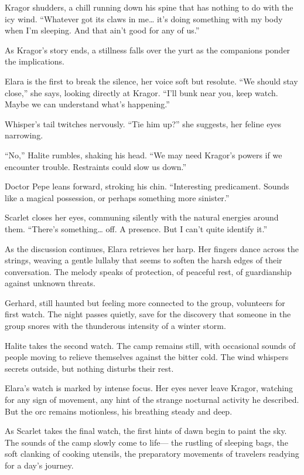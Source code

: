 \documentclass[
  letterpaper,12pt,twoside,twocolumn,openany,
  nodeprecatedcode,bg=full]{dndbook}
\begin{document}
Kragor shudders, a chill running down his spine that has nothing to do
with the icy wind. ``Whatever got its claws in me\ldots{} it's doing
something with my body when I'm sleeping. And that ain't good for any of
us.''

As Kragor's story ends, a stillness falls over the yurt as the
companions ponder the implications.

Elara is the first to break the silence, her voice soft but resolute.
``We should stay close,'' she says, looking directly at Kragor. ``I'll
bunk near you, keep watch. Maybe we can understand what's happening.''

Whisper's tail twitches nervously. ``Tie him up?'' she suggests, her
feline eyes narrowing.

``No,'' Halite rumbles, shaking his head. ``We may need Kragor's powers
if we encounter trouble. Restraints could slow us down.''

Doctor Pepe leans forward, stroking his chin. ``Interesting predicament.
Sounds like a magical possession, or perhaps something more sinister.''

Scarlet closes her eyes, communing silently with the natural energies
around them. ``There's something\ldots{} off. A presence. But I can't
quite identify it.''

As the discussion continues, Elara retrieves her harp. Her fingers dance
across the strings, weaving a gentle lullaby that seems to soften the
harsh edges of their conversation. The melody speaks of protection, of
peaceful rest, of guardianship against unknown threats.

Gerhard, still haunted but feeling more connected to the group,
volunteers for first watch. The night passes quietly, save for the
discovery that someone in the group snores with the thunderous intensity
of a winter storm.

Halite takes the second watch. The camp remains still, with occasional
sounds of people moving to relieve themselves against the bitter cold.
The wind whispers secrets outside, but nothing disturbs their rest.

Elara's watch is marked by intense focus. Her eyes never leave Kragor,
watching for any sign of movement, any hint of the strange nocturnal
activity he described. But the orc remains motionless, his breathing
steady and deep.

As Scarlet takes the final watch, the first hints of dawn begin to paint
the sky. The sounds of the camp slowly come to life--- the rustling of
sleeping bags, the soft clanking of cooking utensils, the preparatory
movements of travelers readying for a day's journey.
\end{document}
